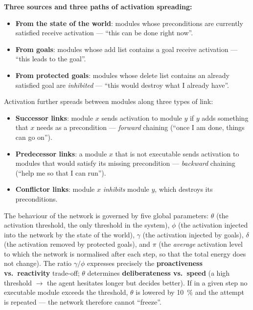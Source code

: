 \documentclass[11pt,a4paper]{article}
\theoremstyle{definition}
\providecommand{\uv}[1]{``#1''}
\begin{document}
\textbf{Three sources and three paths of activation spreading:}
\begin{itemize}
\item \textbf{From the state of the world}: modules whose preconditions are currently satisfied
  receive activation --- \uv{this can be done right now}.
\item \textbf{From goals}: modules whose add list contains a goal receive activation ---
  \uv{this leads to the goal}.
\item \textbf{From protected goals}: modules whose delete list contains an already satisfied goal are
  \emph{inhibited} --- \uv{this would destroy what I already have}.
\end{itemize}
Activation further spreads between modules along three types of link:
\begin{itemize}
\item \textbf{Successor links}: module $x$ sends activation to module $y$ if $y$ adds something that
  $x$ needs as a precondition --- \emph{forward} chaining (\uv{once I am done, things can go on}).
\item \textbf{Predecessor links}: a module $x$ that is not executable sends activation to modules
  that would satisfy its missing precondition --- \emph{backward} chaining (\uv{help me so that I can
  run}).
\item \textbf{Conflictor links}: module $x$ \emph{inhibits} module $y$, which destroys its
  preconditions.
\end{itemize}
The behaviour of the network is governed by five global parameters: $\theta$ (the activation
threshold, the only threshold in the system), $\phi$ (the activation injected into the network by the
state of the world), $\gamma$ (the activation injected by goals), $\delta$ (the activation removed by
protected goals), and $\pi$ (the \emph{average} activation level to which the network is normalised
after each step, so that the total energy does not change).
The ratio $\gamma/\phi$ expresses precisely the \textbf{proactiveness vs.\ reactivity} trade-off;
$\theta$ determines \textbf{deliberateness vs.\ speed} (a high threshold $\to$ the agent hesitates
longer but decides better). If in a given step no executable module exceeds the threshold, $\theta$
is lowered by 10~\% and the attempt is repeated --- the network therefore cannot \uv{freeze}.
\end{document}
